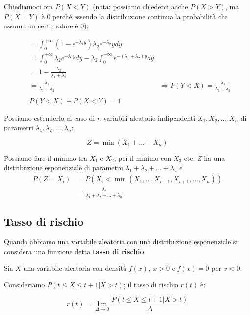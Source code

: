 \documentclass[a4paper,12pt]{book}
\begin{document}
Chiediamoci ora $ P(X < Y) $ (nota: possiamo chiederci anche $ P(X > Y) $, ma $ P(X=Y) $ è 0 perché essendo la distribuzione continua la probabilità che assuma un certo valore è 0):

\begin{align*}
	& = \int_{0}^{+\infty} (1- e^{-\lambda_1 y}) \lambda_2 e^{-\lambda_2}y dy \\
	& = \int_{0}^{+\infty} \lambda_2 e^{-\lambda_1 y} dy -\lambda_2 \int_{0}^{+\infty} e^{-(\lambda_1 + \lambda_2)y} dy \\
	& = 1 - \frac{\lambda_2}{\lambda_1 + \lambda_2} \\
	& = \frac{\lambda_1}{\lambda_1 + \lambda_2}
	& \Rightarrow P(Y < X) = \frac{\lambda_1}{\lambda_1 + \lambda_2}
	\\
	\\
	& P(Y < X) + P(X < Y) = 1 %
\end{align*}

Possiamo estenderlo al caso di $ n $ variabili aleatorie indipendenti $ X_1, X_2, ..., X_n $ di parametri $ \lambda_1, \lambda_2, ..., \lambda_n $:

$$ Z = \min(X_1 + ... + X_n) $$

Possiamo fare il minimo tra $ X_1 $ e $ X_2 $, poi il minimo con $ X_3 $ etc. 
$ Z $ ha una distribuzione esponenziale di parametro $ \lambda_1 + \lambda_2 + ... + \lambda_n $ e 
\begin{align*}
	P(Z = X_i) & = P(X_i < \min(X_1, ..., X_{i-1}, X_{i+1}, ..., X_n)) \\
	& = \frac{\lambda_i}{\lambda_1 + \lambda_2 + ... + \lambda_n}
\end{align*}

\subsection{Tasso di rischio} %
Quando abbiamo una variabile aleatoria con una distribuzione esponenziale si considera una funzione detta \textbf{tasso di rischio}. %

Sia $ X $ una variabile aleatoria con densità $ f(x), \; x > 0 $ e $ f(x) = 0 $ per $ x < 0 $.

Consideriamo $ P(t \le X \le t+1 | X > t) $; il tasso di rischio $ r(t) $ è:

$$ r(t) = \lim\limits_{\Delta \to 0} \frac{P(t \le X \le t+1 | X > t)}{\Delta}$$ %
\end{document}

